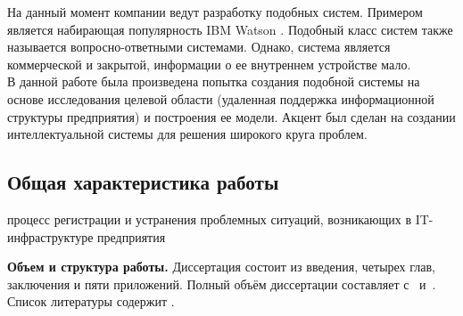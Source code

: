 На данный момент компании ведут разработку подобных систем. Примером является набирающая популярность IBM Watson \cite{WATSON-PO} \cite{WATSON-PTOP}. Подобный класс систем также называется вопросно-ответными системами. Однако, система является коммерческой и закрытой, информации о ее внутреннем устройстве мало. \\
В данной работе была произведена попытка создания подобной системы на основе исследования целевой области (удаленная поддержка информационной структуры предприятия) и построения ее модели.
 Акцент был сделан на создании интеллектуальной системы для решения широкого круга проблем. \\
\subsection{Общая характеристика работы} 
\newcommand{\aim}{\textbf{Целью}}
\newcommand{\scope}{\textbf{Область исследования}}
\newcommand{\subject}{\textbf{Предметом исследования}}
 процесс регистрации и устранения проблемных ситуаций, возникающих в IT-инфраструктуре предприятия 
\newcommand{\tasks}{задачи}
\newcommand{\defpositions}{\textbf{Основные положения, выносимые на~защиту:}}
\newcommand{\novelty}{\textbf{Научная новизна:}}
\newcommand{\influence}{\textbf{Практическая значимость}}
\newcommand{\reliability}{\textbf{Степень достоверности}}
\newcommand{\probation}{\textbf{Апробация работы.}}
\newcommand{\contribution}{\textbf{Личный вклад.}}
\newcommand{\publications}{\textbf{Публикации.}}

\textbf{Объем и структура работы.} Диссертация состоит из введения, четырех глав, заключения и пяти приложений. Полный объём диссертации составляет  
с~
и~. Список литературы содержит  
.
\clearpage



